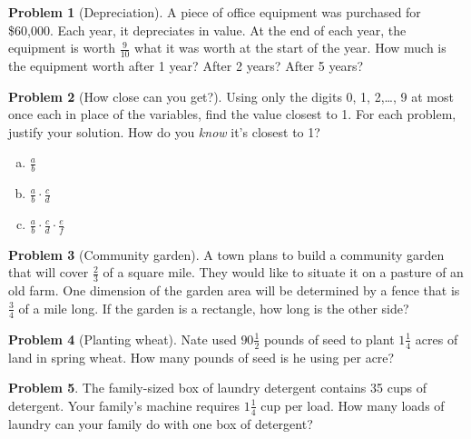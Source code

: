 \documentclass[10pt, reqno]{amsart}
\theoremstyle{remark}
\theoremstyle{definition}
\newtheorem{problem}{Problem}
\numberwithin{equation}{section}  %
\begin{document}
 \begin{problem}[Depreciation]
A piece of office equipment was purchased for \$60,000.  Each year, it depreciates in value.  At the end of each year, the equipment is worth $ \frac{9} {10} $ what it was worth at the start of the year.
How much is the equipment worth after 1 year?  After 2 years?  After 5 years?
\end{problem}

 
\begin{problem}[How close can you get?]
Using only the digits 0, 1, 2,\dots , 9 at most once each in place of the variables, find the value closest to 1.  For each problem, justify your solution.  How do you \emph{know} it's closest to 1?
\begin{enumerate}[(a)]
\item
$\displaystyle \frac a b$\\

\item
$\displaystyle \frac a b \cdot \frac c d$\\

\item
$\displaystyle \frac a b \cdot \frac c d \cdot \frac e f$\\

\end{enumerate}

\end{problem}





 \begin{problem}[Community garden]
A town plans to build a community garden that will cover $\frac 2 3$ of a square mile. They would like to situate it on a pasture of an old  farm. One dimension of the garden area will be determined by a fence that is $\frac 3 4$ of a mile long. If the garden is a rectangle, how long is the other side?


\end{problem}






 \begin{problem}[Planting wheat]
Nate used $90 \frac 1 2$ pounds of seed to plant $1 \frac 1 4$ acres of land in spring wheat.  How many pounds of seed is he using per acre?
\end{problem}

 

\begin{problem}
The family-sized box of laundry detergent contains 35 cups of detergent.  Your family's  machine requires  $1 \frac 1 4$ cup per load.  How many loads of laundry can your family do with one box of detergent?
\end{problem}
\end{document}

